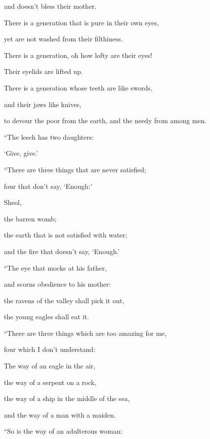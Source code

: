 {\par }{\QB and doesn’t bless their mother.
\par }{\Q {}There is a generation that is pure in their own eyes,
\par }{\QB yet are not washed from their filthiness.
\par }{\Q {}There is a generation, oh how lofty are their eyes!
\par }{\QB Their eyelids are lifted up.
\par }{\Q {}There is a generation whose teeth are like swords,
\par }{\QB and their jaws like knives,
\par }{\QB to devour the poor from the earth, and the needy from among men.
\par }{\BB \par }{\Q {}“The leech has two daughters:
\par }{\QB ‘Give, give.’
\par }{\BB \par }{\Q “There are three things that are never satisfied;
\par }{\QB four that don’t say, ‘Enough:’
\par }{\QB {}Sheol,
\par }{\QB the barren womb;
\par }{\QB the earth that is not satisfied with water;
\par }{\QB and the fire that doesn’t say, ‘Enough.’
\par }{\BB \par }{\Q {}“The eye that mocks at his father,
\par }{\QB and scorns obedience to his mother:
\par }{\QB the ravens of the valley shall pick it out,
\par }{\QB the young eagles shall eat it.
\par }{\BB \par }{\Q {}“There are three things which are too amazing for me,
\par }{\QB four which I don’t understand:
\par }{\QB {}The way of an eagle in the air,
\par }{\QB the way of a serpent on a rock,
\par }{\QB the way of a ship in the middle of the sea,
\par }{\QB and the way of a man with a maiden.
\par }{\BB \par }{\Q {}“So is the way of an adulterous woman:
}
